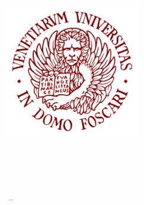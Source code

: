 
\begin{titlepage}
\begin{center}

\hfill
\vfill

\begingroup
\Large\color{Maroon}\spacedallcaps{\myTitle} \\ \bigskip %
\endgroup

\Large\spacedlowsmallcaps{\myName} %

\vfill

\includegraphics[width=6cm]{images/logo} \\ \medskip %

\large

\mySubtitle \\ \medskip %
\myFaculty \\
\myUni \\ \bigskip

\myTime\ -- \myVersion %

\vfill

\end{center}

\end{titlepage}
